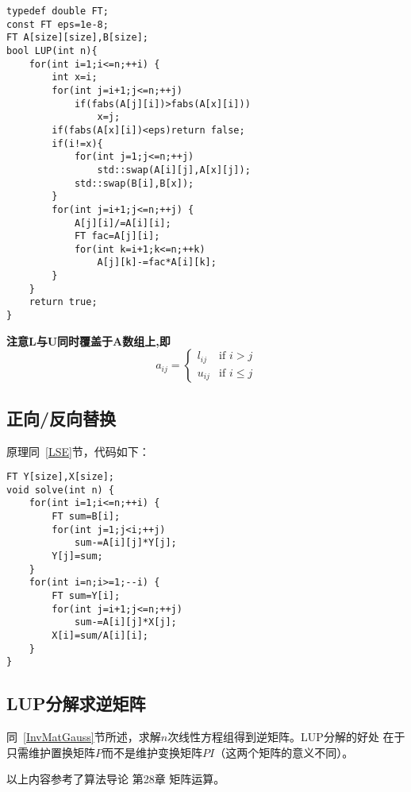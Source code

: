 \begin{lstlisting}
typedef double FT;
const FT eps=1e-8;
FT A[size][size],B[size];
bool LUP(int n){
    for(int i=1;i<=n;++i) {
        int x=i;
        for(int j=i+1;j<=n;++j)
            if(fabs(A[j][i])>fabs(A[x][i]))
                x=j;
        if(fabs(A[x][i])<eps)return false;
        if(i!=x){
            for(int j=1;j<=n;++j)
                std::swap(A[i][j],A[x][j]);
            std::swap(B[i],B[x]);
        }
        for(int j=i+1;j<=n;++j) {
            A[j][i]/=A[i][i];
            FT fac=A[j][i];
            for(int k=i+1;k<=n;++k)
                A[j][k]-=fac*A[i][k];
        }
    }
    return true;
}
\end{lstlisting}
{\bfseries 注意L与U同时覆盖于A数组上,即}
\begin{displaymath}
	a_{ij}=\left\{\begin{array}{ll}
		l_{ij} & \textrm{if $i>j$}     \\
		u_{ij} & \textrm{if $i\leq j$}
	\end{array}\right.
\end{displaymath}
\subsection{正向/反向替换}
原理同~\ref{LSE}节，代码如下：
\begin{lstlisting}
FT Y[size],X[size];
void solve(int n) {
    for(int i=1;i<=n;++i) {
        FT sum=B[i];
        for(int j=1;j<i;++j)
            sum-=A[i][j]*Y[j];
        Y[j]=sum;
    }
    for(int i=n;i>=1;--i) {
        FT sum=Y[i];
        for(int j=i+1;j<=n;++j)
            sum-=A[i][j]*X[j];
        X[i]=sum/A[i][i];
    }
}
\end{lstlisting}
\subsection{LUP分解求逆矩阵}
同~\ref{InvMatGauss}节所述，求解$n$次线性方程组得到逆矩阵。LUP分解的好处
在于只需维护置换矩阵$P$而不是维护变换矩阵$PI$（这两个矩阵的意义不同）。


以上内容参考了算法导论\cite{ITA3} 第28章 矩阵运算。
